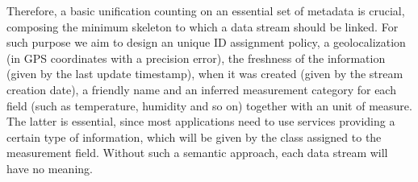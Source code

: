 Therefore, a basic unification counting on an essential set of metadata is crucial, composing the minimum skeleton to which a data stream should be linked.
For such purpose we aim to design an unique ID assignment policy, a geolocalization (in GPS coordinates with a precision error), the freshness of the information (given by the last update timestamp), when it was created (given by the stream creation date), a friendly name and an inferred measurement category for each field (such as temperature, humidity and so on) together with an unit of measure.
The latter is essential, since most applications need to use services providing a certain type of information, which will be given by the class assigned to the measurement field.
Without such a semantic approach, each data stream will have no meaning.
